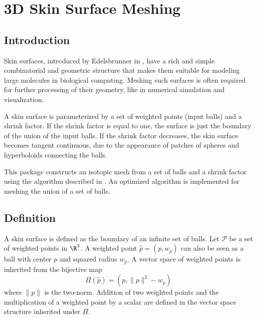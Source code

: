 
\chapter{3D Skin Surface Meshing}
\label{chapterSkinSurface}

\minitoc

\section{Introduction}
\label{sectionSkinSurfaceIntro}

Skin surfaces, introduced by Edelsbrunner in \cite{cgal:e-dssd-99},
have a rich and simple combinatorial and geometric structure that
makes them suitable for modeling large molecules in biological
computing.  Meshing such surfaces is often required for further
processing of their geometry, like in numerical simulation and
visualization.

A skin surface is parameterized by a set of weighted points (input
balls) and a shrink factor. If the shrink factor is equal to one, the
surface is just the boundary of the union of the input balls.  If the
shrink factor decreases, the skin surface becomes tangent continuous,
due to the appearance of patches of spheres and hyperboloids
connecting the balls.

This package constructs an isotopic mesh from a set of balls and a
shrink factor using the algorithm described in
\cite{cgal:kv-mssct-05}. An optimized algorithm is implemented for
meshing the union of a set of balls.

\section{Definition}
A skin surface is defined as the boundary of an infinite set of balls.
Let $\mathcal{P}$ be a set of weighted points in $\R^3$. A weighted
point ${\hat{p}}=(p,w_p)$ can also be seen as a ball with center $p$
and squared radius $w_p$. A vector space of weighted points is
inherited from the bijective map
\[\Pi({\hat{p}}) = ({p, \|{p}\|^2-w_p})\]
where $\|{p}\|$ is the two-norm. Addition of two weighted points and
the multiplication of a weighted point by a scalar are defined in the
vector space structure inherited under $\Pi$.

